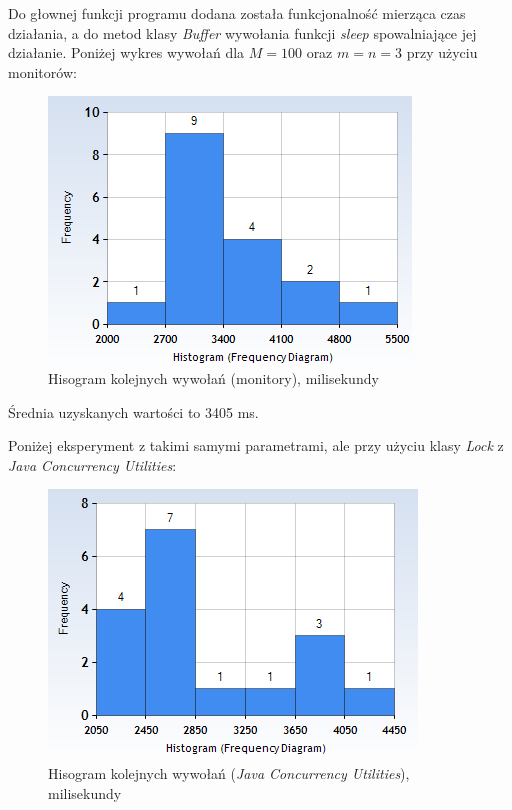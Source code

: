 \documentclass{article}
\begin{document}
Do głownej funkcji programu dodana została funkcjonalność mierząca czas działania, a do
metod klasy \textit{Buffer} wywołania funkcji \textit{sleep} spowalniające jej działanie. Poniżej wykres wywołań dla $M=100$ oraz $m=n=3$ przy użyciu monitorów:

\begin{figure}[H]
    \centering
    \includegraphics[width=\textwidth]{figure_1.png}
    \caption{Hisogram kolejnych wywołań (monitory), milisekundy}
\end{figure}

Średnia uzyskanych wartości to 3405 ms.

Poniżej eksperyment z takimi samymi parametrami, ale przy użyciu klasy \textit{Lock} z \textit{Java Concurrency Utilities}:

\begin{figure}[H]
    \centering
    \includegraphics[width=\textwidth]{figure_2.png}
    \caption{Hisogram kolejnych wywołań (\textit{Java Concurrency Utilities}), milisekundy}
\end{figure}
\end{document}
